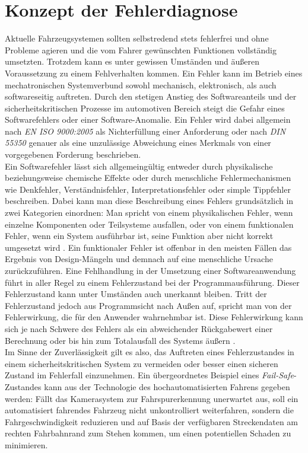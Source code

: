 \section{Konzept der Fehlerdiagnose} \label{sec:KonzeptDiagnose} %

Aktuelle Fahrzeugsystemen sollten selbstredend stets fehlerfrei und ohne Probleme agieren und die vom Fahrer gewünschten Funktionen vollständig umsetzten. Trotzdem kann es unter gewissen Umständen und äußeren Voraussetzung zu einem Fehlverhalten kommen. Ein Fehler kann im Betrieb eines mechatronischen Systemverbund sowohl mechanisch, elektronisch, als auch softwareseitig auftreten. Durch den stetigen Anstieg des Softwareanteils und der sicherheitskritischen Prozesse im automotiven Bereich steigt die Gefahr eines Softwarefehlers oder einer Software-Anomalie. Ein Fehler wird dabei allgemein nach \emph{EN ISO 9000:2005} \cite{DINDeutschesInstitutfurNormunge.V..201511} als \glqq Nichterfüllung einer Anforderung\grqq{} oder nach \emph{DIN 55350} \cite{DINDeutschesInstitutfurNormunge.V..200805} genauer als \glqq eine unzulässige Abweichung eines Merkmals von einer vorgegebenen Forderung\grqq{} beschrieben. \\
Ein Softwarefehler lässt sich allgemeingültig entweder durch physikalische beziehungsweise chemische Effekte oder durch menschliche Fehlermechanismen wie Denkfehler, Verständnisfehler, Interpretationsfehler oder simple Tippfehler beschreiben. Dabei kann man diese Beschreibung eines Fehlers grundsätzlich in zwei Kategorien einordnen: Man spricht von einem physikalischen Fehler, wenn einzelne Komponenten oder Teilsysteme ausfallen, oder von einem funktionalen Fehler, wenn ein System ausführbar ist, seine Funktion aber nicht korrekt umgesetzt wird \cite{Borcsok.2007}. Ein funktionaler Fehler ist offenbar in den meisten Fällen das Ergebnis von Design-Mängeln und demnach auf eine menschliche Ursache zurückzuführen. Eine Fehlhandlung in der Umsetzung einer Softwareanwendung führt in aller Regel zu einem Fehlerzustand bei der Programmausführung. Dieser Fehlerzustand kann unter Umständen auch unerkannt bleiben. Tritt der Fehlerzustand jedoch aus Programmsicht nach Außen auf, spricht man von der Fehlerwirkung, die für den Anwender wahrnehmbar ist. Diese Fehlerwirkung kann sich je nach Schwere des Fehlers als ein abweichender Rückgabewert einer Berechnung oder bis hin zum Totalausfall des Systems äußern \cite{ISTQBAISBLGermanTestingBoarde.V.2017}. \\
Im Sinne der Zuverlässigkeit gilt es also, das Auftreten eines Fehlerzustandes in einem sicherheitskritischen System zu vermeiden oder besser einen sicheren Zustand im Fehlerfall einzunehmen. Ein übergeordnetes Beispiel eines \emph{Fail-Safe}-Zustandes kann aus der Technologie des hochautomatisierten Fahrens gegeben werden: Fällt das Kamerasystem zur Fahrspurerkennung unerwartet aus, soll ein automatisiert fahrendes Fahrzeug nicht unkontrolliert weiterfahren, sondern die Fahrgeschwindigkeit reduzieren und auf Basis der verfügbaren Streckendaten am rechten Fahrbahnrand zum Stehen kommen, um einen potentiellen Schaden zu minimieren.
 
